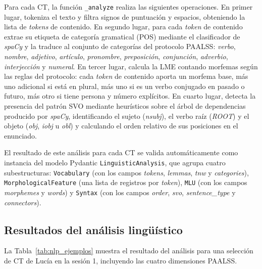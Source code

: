 Para cada \ac{CT}, la función \texttt{\_analyze} realiza las siguientes operaciones.
En primer lugar, tokeniza el texto y filtra signos de puntuación y espacios, obteniendo
la lista de \emph{tokens} de contenido. En segundo lugar, para cada \emph{token} de
contenido extrae su etiqueta de categoría gramatical (\ac{POS}) mediante el clasificador
de \emph{spaCy} y la traduce al conjunto de categorías del protocolo \ac{PAALSS}:
\emph{verbo}, \emph{nombre}, \emph{adjetivo}, \emph{artículo}, \emph{pronombre},
\emph{preposición}, \emph{conjunción}, \emph{adverbio}, \emph{interjección} y
\emph{numeral}. En tercer lugar, calcula la \ac{LME} contando morfemas según las reglas
del protocolo: cada \emph{token} de contenido aporta un morfema base, más uno adicional
si está en plural, más uno si es un verbo conjugado en pasado o futuro, más otro si
tiene persona y número explícitos. En cuarto lugar, detecta la presencia del patrón
\ac{SVO} mediante heurísticos sobre el árbol de dependencias producido por \emph{spaCy},
identificando el sujeto (\emph{nsubj}), el verbo raíz (\emph{ROOT}) y el objeto
(\emph{obj}, \emph{iobj} u \emph{obl}) y calculando el orden relativo de sus posiciones
en el enunciado.

El resultado de este análisis para cada \ac{CT} se valida automáticamente como
instancia del modelo Pydantic \texttt{LinguisticAnalysis}, que agrupa cuatro subestructuras:
\texttt{Vocabulary} (con los campos \emph{tokens}, \emph{lemmas}, \emph{tnw} y
\emph{categories}), \texttt{MorphologicalFeature} (una lista de registros por
\emph{token}), \texttt{MLU} (con los campos \emph{morphemes} y \emph{words}) y
\texttt{Syntax} (con los campos \emph{order}, \emph{svo}, \emph{sentence\_type} y
\emph{connectors}).


\subsection{Resultados del análisis lingüístico}
\label{subsec:nlp_resultados}

La Tabla~\ref{tab:nlp_ejemplos} muestra el resultado del análisis para una selección
de \ac{CT} de Lucía en la sesión 1, incluyendo las cuatro dimensiones \ac{PAALSS}.

